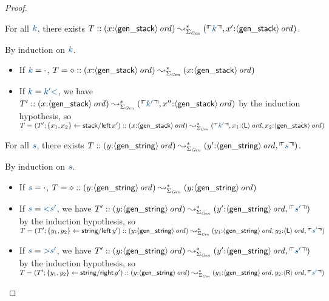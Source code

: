 \begin{proof}
\begin{lemma} For all $\obj{k}$, there exists
$T :: ({x{:}\istrue{\susp{\sf gen\_stack}}}) \leadsto^*_{\Sigma_{\it Gen}} 
({\ctxinterp{k}, x'{:}\istrue{\susp{\sf gen\_stack}}})$.
\end{lemma}
\noindent
By induction on $\obj{k}$. 
\begin{itemize}
\item If $\obj{k} = \cdot$, $T = \diamond ::
({x{:}{\langle {\sf gen\_stack} \rangle}\,{{\it ord}}}) \leadsto^*_{\Sigma_{\it Gen}} 
(x{:}{\langle {\sf gen\_stack} \rangle}\,{{\it ord}})$
\item If $\obj{k} = \obj{k' {\sf <}}$, we have 
$T' :: ({x{:}\istrue{\susp{\sf gen\_stack}}}) \leadsto^*_{\Sigma_{\it Gen}} 
({\ctxinterp{k'}, x''{:}\istrue{\susp{\sf gen\_stack}}})$ by the induction
hypothesis, so $T = (T'; \trstep{x_1, x_2}{{\sf stack/left}\,x'}) :: 
({x{:}\istrue{\susp{\sf gen\_stack}}}) \leadsto^*_{\Sigma_{\it Gen}} 
({\ctxinterp{k'}, x_1{:}\istrue{\susp{\sf L}}, x_2{:}\istrue{\susp{\sf gen\_stack}}})$
\end{itemize}

\begin{lemma} For all $\obj{s}$, there exists
$T :: ({y{:}\istrue{\susp{\sf gen\_string}}}) \leadsto^*_{\Sigma_{\it Gen}} 
({y'{:}\istrue{\susp{\sf gen\_string}}, \ctxinterp{s}})$.
\end{lemma}
\noindent
By induction on $\obj{s}$.
\begin{itemize}
\item If $\obj{s} = \cdot$, $T = \diamond ::
({y{:}{\langle {\sf gen\_string} \rangle}\,{{\it ord}}}) \leadsto^*_{\Sigma_{\it Gen}} 
(y{:}{\langle {\sf gen\_string} \rangle}\,{{\it ord}})$
\item If $\obj{s} = \obj{{\sf <}s' }$, we have 
$T' :: ({y{:}\istrue{\susp{\sf gen\_string}}}) \leadsto^*_{\Sigma_{\it Gen}} 
(y'{:}\istrue{\susp{\sf gen\_string}}, \ctxinterp{s'})$ by the induction
hypothesis, so $T = (T'; \trstep{y_1, y_2}{{\sf string/left}\,y'}) :: 
({y{:}\istrue{\susp{\sf gen\_string}}}) \leadsto^*_{\Sigma_{\it Gen}} 
(y_1{:}\istrue{\susp{\sf gen\_string}},
 y_2{:}\istrue{\susp{\sf L}},
\ctxinterp{s'})$
\item If $\obj{s} = \obj{{\sf >}s' }$, we have 
$T' :: ({y{:}\istrue{\susp{\sf gen\_string}}}) \leadsto^*_{\Sigma_{\it Gen}} 
(y'{:}\istrue{\susp{\sf gen\_string}}, \ctxinterp{s'})$ by the induction
hypothesis, so $T = (T'; \trstep{y_1, y_2}{{\sf string/right}\,y'}) :: 
({y{:}\istrue{\susp{\sf gen\_string}}}) \leadsto^*_{\Sigma_{\it Gen}} 
(y_1{:}\istrue{\susp{\sf gen\_string}},
 y_2{:}\istrue{\susp{\sf R}},
\ctxinterp{s'})$
\end{itemize}


\end{proof}
